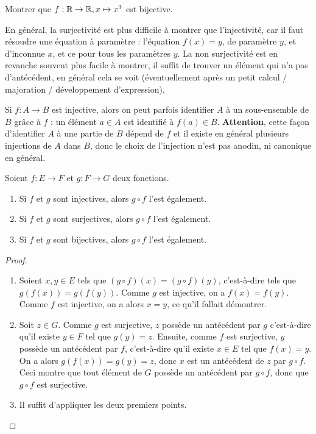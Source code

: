 \begin{exercice}
Montrer que  $f: \mathbb{R}\to \mathbb{R}, x\mapsto x^3$ est bijective.
\end{exercice}


\begin{remarque}
En général, la surjectivité est plus difficile à montrer que l'injectivité, car il faut résoudre une équation à paramètre : l'équation $f(x)=y$, de paramètre $y$, et d'inconnue $x$, et ce pour tous les paramètres $y$. La non surjectivité est en revanche souvent plus facile à montrer, il suffit de trouver un élément qui n'a pas d'antécédent, en général cela se voit (éventuellement après un petit calcul / majoration / développement d'expression).
\end{remarque}

\begin{remarque}
Si $f : A\to B$ est injective, alors on peut parfois \og identifier\fg{} $A$ à un sous-ensemble de $B$ grâce à $f$ : un élément $a \in A$ est identifié à $f(a) \in B$. \textbf{Attention}, cette façon d'identifier $A$ à une partie de $B$ dépend de $f$ et il existe en général plusieurs injections de $A$ dans $B$, donc le choix de l'injection n'est pas anodin, ni canonique en général.
\end{remarque}


\begin{proposition}\label{prop-composition-inj-surj-bij}
Soient $f : E\to F$ et $g : F\to G$ deux fonctions.
\begin{enumerate}
\item Si $f$ et $g$ sont injectives, alors $g\circ f$ l'est également.
\item Si $f$ et $g$ sont surjectives, alors $g\circ f$ l'est également.
\item Si $f$ et $g$ sont bijectives, alors $g\circ f$ l'est également.
\end{enumerate}
\end{proposition}
\begin{proof}
\begin{enumerate}
\item Soient $x, y \in E$ tels que $(g\circ f)(x) = (g\circ f)(y) $, c'est-à-dire tels que $g(f(x))=g(f(y))$. Comme $g$ est injective, on a $f(x)=f(y)$. Comme $f$ est injective, on a alors $x=y$, ce qu'il fallait démontrer.
\item Soit $z\in G$. Comme $g$ est surjective, $z$ possède un antécédent par $g$ c'est-à-dire qu'il existe $y\in F$ tel que $g(y)=z$. Ensuite, comme $f$ est surjective, $y$ possède un antécédent par $f$, c'est-à-dire qu'il existe $x\in E$ tel que $f(x)=y$. On a alors $g(f(x)) = g(y)=z$, donc $x$ est un antécédent de $z$ par $g\circ f$. Ceci montre que tout élément de $G$ possède un antécédent par $g\circ f$, donc que $g\circ f$ est surjective.
\item Il suffit d'appliquer les deux premiers points.
\end{enumerate}
\end{proof}



